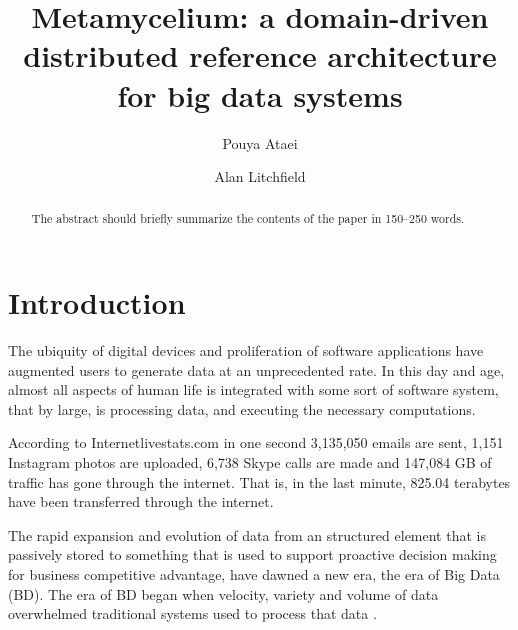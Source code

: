 \documentclass[runningheads]{llncs}
\begin{document}
%
\title{Metamycelium: a domain-driven distributed reference architecture for big data systems}
%
%
\author{Pouya Ataei \and
Alan Litchfield}
%
%
%
\maketitle              %
%
\begin{abstract}
The abstract should briefly summarize the contents of the paper in
150--250 words.

\end{abstract}
%
%
%
\section{Introduction}
The ubiquity of digital devices and proliferation of software applications have augmented users to generate data at an unprecedented rate. In this day and age, almost all aspects of human life is integrated with some sort of software system, that by large, is processing data, and executing the necessary computations. 

According to Internetlivestats.com \cite{internet2019internet} in one second 3,135,050 emails are sent, 1,151 Instagram photos are uploaded, 6,738 Skype calls are made and 147,084 GB of traffic has gone through the internet. That is, in the last minute, 825.04 terabytes have been transferred through the internet. 

The rapid expansion and evolution of data from an structured element that is passively stored to something that is used to support proactive decision making for business competitive advantage, have dawned a new era, the era of Big Data (BD). The era of BD began when velocity, variety and volume of data overwhelmed traditional systems used to process that data \cite{ataei2021neomycelia}\cite{AtaeiACIS}. 
\end{document}
